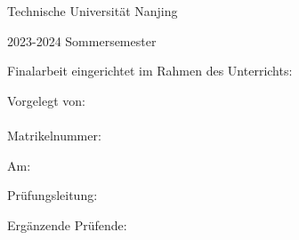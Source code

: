 \begin{titlepage}
\begin{center}
	{
	Technische Universität Nanjing\\\faculty\par}
	\vspace{.2cm}
{\Large 2023-2024 Sommersemester \studies\\}
\vspace{6\baselineskip}
{\Huge{}\thesistitleDE\par}
\vspace{1cm}
{\Huge{}\thesistitleEN\par}
\vspace{6\baselineskip}

Finalarbeit eingerichtet im Rahmen des Unterrichts:

	\vspace{.2cm}
	\emph{\degree}
	\vspace{.2cm}

\end{center}
\vfill
\parbox[t]{.4\textwidth}{
	Vorgelegt von:\\
	\student\\
	Matrikelnummer: \matrnr\par
	\vspace{\baselineskip}
	Am: \submissiondate\par
}
\hfill
\parbox[t]{.4\textwidth}{
Prüfungsleitung:\\
\supervisor%

\ifthenelse{\equal{\secsupervisor}{}}{}
{%
\vspace{\baselineskip}
Ergänzende Prüfende:\\
\secsupervisor%
}}
\end{titlepage}
\cleardoublepage\par
